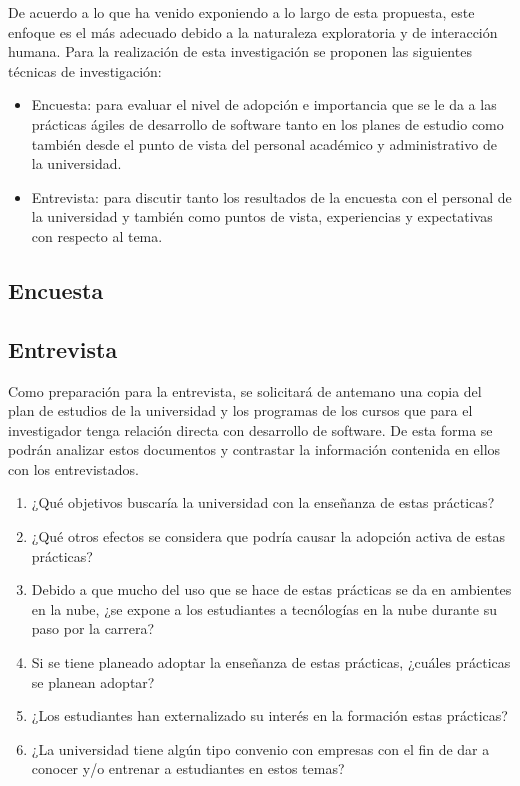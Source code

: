 De acuerdo a lo que ha venido exponiendo a lo largo de esta propuesta, este enfoque es el más adecuado debido a la naturaleza exploratoria y de interacción humana. Para la realización de esta investigación se proponen las siguientes técnicas de investigación:
\begin{itemize}
    \item Encuesta: para evaluar el nivel de adopción e importancia que se le da a las prácticas ágiles de desarrollo de software tanto en los planes de estudio como también desde el punto de vista del personal académico y administrativo de la universidad. 
    \item Entrevista: para discutir tanto los resultados de la encuesta con el personal de la universidad y también como puntos de vista, experiencias y expectativas con respecto al tema.   
\end{itemize}
 
\subsection{Encuesta}


\subsection{Entrevista}

Como preparación para la entrevista, se solicitará de antemano una copia del plan de estudios de la universidad y los programas de los cursos que para el investigador tenga relación directa con desarrollo de software. De esta forma se podrán analizar estos documentos y contrastar la información contenida en ellos con los entrevistados.

\begin{enumerate}
    \item ¿Qué objetivos buscaría la universidad con la enseñanza de estas prácticas?
    \item ¿Qué otros efectos se considera que podría causar la adopción activa de estas prácticas?
    \item Debido a que mucho del uso que se hace de estas prácticas se da en ambientes en la nube, ¿se expone a los estudiantes a tecnólogías en la nube durante su paso por la carrera?
    \item Si se tiene planeado adoptar la enseñanza de estas prácticas, ¿cuáles prácticas se planean adoptar?
    \item ¿Los estudiantes han externalizado su interés en la formación estas prácticas?
    \item ¿La universidad tiene algún tipo convenio con empresas con el fin de dar a conocer y/o entrenar a estudiantes en estos temas?
\end{enumerate}



